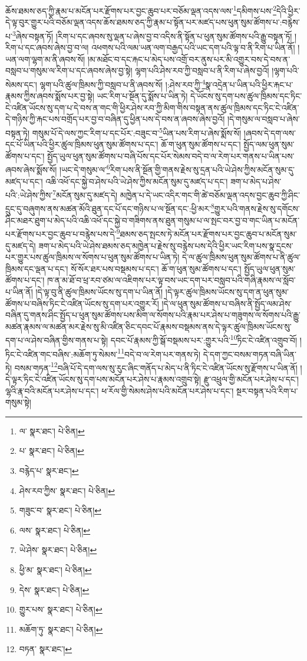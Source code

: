ཆོས་ཐམས་ཅད་ཀྱི་རྣམ་པ་མངོན་པར་རྫོགས་པར་བྱང་ཆུབ་པར་བཅོམ་ལྡན་འདས་ལས་\footnote{ལ་  སྣར་ཐང་།  པེ་ཅིན། }དམིགས་པས་\footnote{པ་  སྣར་ཐང་།  པེ་ཅིན། }དེའི་ཕྱིར་དེ་ལྟ་བུར་གྱུར་པའི་བཅོམ་ལྡན་འདས་ཆོས་ཐམས་ཅད་ཀྱི་རྣམ་པ་སྟོན་པར་མཛད་པས་ཕུན་སུམ་ཚོགས་པ་:བརྙེས་པ་\footnote{བརྙེད་པ་  སྣར་ཐང་། }ཞེས་བསྟན་ཏོ། །རིག་པ་དང་ཞབས་སུ་ལྡན་པ་ཞེས་བྱ་བ་འདིས་ནི་སྟོན་པ་ཕུན་སུམ་ཚོགས་པའི་རྒྱུ་བསྟན་ཏོ། །རིག་པ་དང་ཞབས་ཞེས་བྱ་བ་ལ། འཕགས་པའི་ལམ་ཡན་ལག་བརྒྱད་པའི་ཡང་དག་པའི་ལྟ་བ་ནི་རིག་པ་ཡིན་ནོ། །ཡན་ལག་ལྷག་མ་ནི་ཞབས་སོ། །མ་མཐོང་བ་དང་རྐང་པ་མེད་པས་འགྲོ་བར་ནུས་པར་མི་འགྱུར་བས་དེ་བས་ན་བསླབ་པ་གསུམ་ལ་རིག་པ་དང་ཞབས་ཞེས་བྱ་སྟེ། ལྷག་པའི་ཤེས་རབ་ཀྱི་བསླབ་པ་ནི་རིག་པ་ཞེས་བྱའོ། །ལྷག་པའི་སེམས་དང་། ལྷག་པའི་ཚུལ་ཁྲིམས་ཀྱི་བསླབ་པ་ནི་ཞབས་སོ། །:ཤེས་རབ་ཀྱི་\footnote{ཤེས་རབ་ཀྱིས་  སྣར་ཐང་།  པེ་ཅིན། }སྣ་འདྲེན་པ་ཡིན་པའི་ཕྱིར་རྐང་པ་རྣམས་ཀྱིས་ཞབས་སྨོས་པར་བྱ་སྟེ། ཡང་རིག་པ་སྔོན་དུ་སྨོས་པ་ཡིན་ཏེ། དེ་ཡོངས་སུ་དག་པས་ཚུལ་ཁྲིམས་དང་ཏིང་ངེ་འཛིན་ཡོངས་སུ་དག་པ་དེ་བས་ན་གང་གི་ཕྱིར་ཤེས་རབ་ཀྱི་མིག་གིས་བསྟན་ནས་ཚུལ་ཁྲིམས་དང་ཏིང་ངེ་འཛིན་དེ་གཉིས་ཀྱི་རྐང་པས་བགྲོད་པར་བྱ་བ་བཞིན་དུ་ཕྱིན་པས་དེ་བས་ན་ཞབས་ཞེས་བྱའོ། །དེ་གསུམ་ལ་བསླབ་པ་ཞེས་བསྟན་ཏེ། གསུམ་པོ་དེ་ལས་ཀྱང་རིག་པ་དང་པོར་:བཟུང་བ་\footnote{གཟུང་བ་  སྣར་ཐང་།  པེ་ཅིན། }ཡིན་པས་རིག་པ་ཞེས་སྨོས་སོ། །ཞབས་དེ་དག་ལས་དང་པོ་ཡིན་པའི་ཕྱིར་ཚུལ་ཁྲིམས་ཕུན་སུམ་ཚོགས་པ་དང་། ཆོ་ག་ཕུན་སུམ་ཚོགས་པ་དང་། སྤྱོད་ལམ་ཕུན་སུམ་ཚོགས་པ་དང་། སྤྱོད་ཡུལ་ཕུན་སུམ་ཚོགས་པ་བཞི་པོས་དང་པོར་སེམས་བདེ་བ་ལ་རེག་པར་གནས་པ་ཡིན་པས་ཞབས་ཞེས་སྨོས་སོ། །ཡང་དེ་གསུམ་ལ་\footnote{ལས་  སྣར་ཐང་།  པེ་ཅིན། }རིག་པས་ནི་སྔོན་གྱི་གནས་རྗེས་སུ་དྲན་པའི་ཡེ་ཤེས་ཀྱིས་མངོན་སུམ་དུ་མཛད་པ་དང་། འཆི་འཕོ་དང་སྐྱེ་བ་ཤེས་པའི་ཡེ་ཤེས་ཀྱིས་མངོན་སུམ་དུ་མཛད་པ་དང་། ཟག་པ་མེད་པ་ཤེས་པའི་:ཡེ་ཤེས་ཀྱིས་\footnote{ཡེ་ཤེས་  སྣར་ཐང་།  པེ་ཅིན། }མངོན་སུམ་དུ་མཛད་དེ། མཁྱེན་པ་དེ་ཡང་འདིར་གང་གི་ཚེ་བཅོམ་ལྡན་འདས་བྱང་ཆུབ་ཀྱི་ཤིང་དྲུང་དུ་བཞུགས་ནས་མཚན་མོའི་ཐུན་དང་པོ་དང་གཉིས་པ་ལ་སྔོན་དང་:ཕྱི་མར་\footnote{ཕྱི་མ་  སྣར་ཐང་།  པེ་ཅིན། }གྱུར་པའི་གནས་རྗེས་སུ་དགོངས་ཤིང་མཐར་ཐུག་པ་མེད་པའི་འཆི་འཕོ་དང་སྐྱེ་བ་གཟིགས་ནས་ཐུན་གསུམ་པ་ལ་སྤང་བར་བྱ་བ་གང་ཡིན་པ་མངོན་པར་རྫོགས་པར་བྱང་ཆུབ་པ་བརྙེས་པས་དེ་\footnote{དེས་  སྣར་ཐང་།  པེ་ཅིན། }ཐམས་ཅད་སྤངས་ཏེ་མངོན་པར་རྫོགས་པར་བྱང་ཆུབ་པ་མངོན་སུམ་དུ་མཛད་དེ། ཟག་པ་མེད་པའི་ཡེ་ཤེས་ཐམས་ཅད་མཁྱེན་པ་རྗེས་སུ་བརྙེས་པས་དེའི་ཕྱིར་ཡང་རིག་པས་སྣ་དྲངས་པར་གྱུར་པས་ཚུལ་ཁྲིམས་ལ་སོགས་པ་ཕུན་སུམ་ཚོགས་པ་ཡིན་ཏེ། དེ་ལ་ཚུལ་ཁྲིམས་ཕུན་སུམ་ཚོགས་པ་ནི་ཚུལ་ཁྲིམས་དང་ལྡན་པ་དང་། སོ་སོར་ཐར་པས་བསྡམས་པ་དང་། ཆོ་ག་ཕུན་སུམ་ཚོགས་པ་དང་། སྤྱོད་ཡུལ་ཕུན་སུམ་ཚོགས་པ་དང་། ཁ་ན་མ་ཐོ་བ་ཕྲ་རབ་ཙམ་ལ་འཇིགས་པར་ལྟ་བས་ཡང་དག་པར་བསླབ་པའི་གཞི་རྣམས་ལ་སློབ་པ་ཡིན་ནོ། །དེ་ལྟ་བུ་ནི་ཚུལ་ཁྲིམས་ཡོངས་སུ་དག་པ་ཡིན་ནོ། །དེ་ལྟར་ཚུལ་ཁྲིམས་ཡོངས་སུ་དག་ན་ཕུན་སུམ་ཚོགས་པ་བཞིས་ཏིང་ངེ་འཛིན་ཡོངས་སུ་དག་པར་འགྱུར་རོ། །དེ་ལ་ཕུན་སུམ་ཚོགས་པ་བཞིས་ནི་སྤྱོད་ལམ་ཤེས་བཞིན་དུ་གནས་ཤིང་སྤྱོད་པ་ཕུན་སུམ་ཚོགས་པས་མིག་ལ་སོགས་པའི་རྣམ་པར་ཤེས་པ་གཟུགས་ལ་སོགས་པའི་རྒྱུ་མཚན་རྣམས་ལ་མཚན་མར་རྗེས་སུ་མི་འཛིན་ཅིང་དབང་པོ་རྣམས་བསྡམས་ནས་དེ་ལྟར་ཚུལ་ཁྲིམས་ཡོངས་སུ་དག་པ་ལ་ཤེས་བཞིན་གྱིས་གནས་པ་སྟེ། དབང་པོ་རྣམས་ཀྱི་སྒོ་བསྡམས་པར་:གྱུར་པའི་\footnote{གྱུར་པས་  སྣར་ཐང་།  པེ་ཅིན། }ཏིང་ངེ་འཛིན་འགྲུབ་བོ། །ཏིང་ངེ་འཛིན་གང་བཞིས་:མཆོག་ཏུ་སེམས་\footnote{མཆོག་ཏུ་  སྣར་ཐང་།  པེ་ཅིན། }བདེ་བ་ལ་རེག་པར་གནས་ཏེ། དེ་དག་ཀྱང་བསམ་གཏན་བཞི་ཡིན་ཏེ། བསམ་གཏན་\footnote{བཏན་  སྣར་ཐང་། }བཞི་པོ་དེ་དག་ལས་སུ་རུང་ཞིང་གནོད་པ་མེད་པ་ནི་ཏིང་ངེ་འཛིན་ཡོངས་སུ་རྫོགས་པ་ཡིན་ནོ། །དེ་ལྟར་ཏིང་ངེ་འཛིན་ཡོངས་སུ་དག་པས་མངོན་པར་ཤེས་པ་རྣམས་འགྲུབ་སྟེ། རྫུ་འཕྲུལ་གྱི་མངོན་པར་ཤེས་པ་དང་། ལྷའི་རྣ་བའི་མངོན་པར་ཤེས་པ་དང་། ཕ་རོལ་གྱི་སེམས་ཤེས་པའི་མངོན་པར་ཤེས་པ་དང་། སྔར་བསྟན་པའི་རིག་པ་གསུམ་སྟེ། 